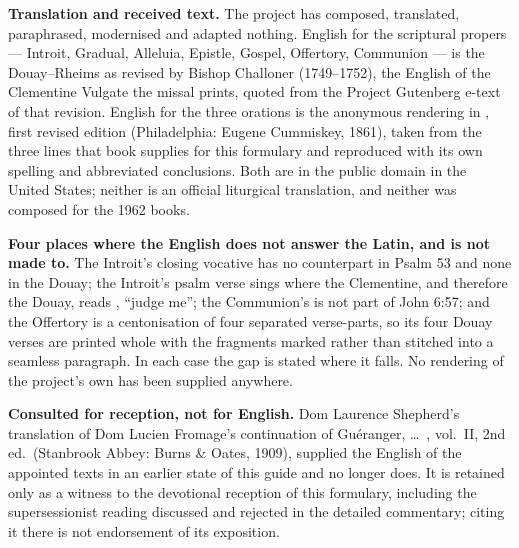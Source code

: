 \textbf{Translation and received text.} The project has composed, translated,
paraphrased, modernised and adapted nothing. English for the scriptural
propers --- Introit, Gradual, Alleluia, Epistle, Gospel, Offertory, Communion
--- is the Douay--Rheims as revised by Bishop Challoner (1749--1752), the
English of the Clementine Vulgate the missal prints, quoted from the Project
Gutenberg e-text of that revision. English for the three orations is the
anonymous rendering in , first revised edition (Philadelphia:
Eugene Cummiskey, 1861), taken from the three lines that book supplies for
this formulary and reproduced with its own spelling and abbreviated
conclusions. Both are in the public domain in the United States; neither is an
official liturgical translation, and neither was composed for the 1962 books.

\textbf{Four places where the English does not answer the Latin, and is not
made to.} The Introit's closing vocative  has no
counterpart in Psalm 53 and none in the Douay; the Introit's psalm verse sings
 where the Clementine, and therefore the Douay, reads
, ``judge me''; the Communion's  is not
part of John 6:57; and the Offertory is a centonisation of four separated
verse-parts, so its four Douay verses are printed whole with the fragments
marked rather than stitched into a seamless paragraph. In each case the gap is
stated where it falls. No rendering of the project's own has been supplied
anywhere.

\textbf{Consulted for reception, not for English.} Dom Laurence Shepherd's
translation of Dom Lucien Fromage's continuation of Guéranger,  \dots\ , vol.~II, 2nd ed.\ (Stanbrook Abbey: Burns \& Oates, 1909),
supplied the English of the appointed texts in an earlier state of this guide
and no longer does. It is retained only as a witness to the devotional
reception of this formulary, including the supersessionist reading discussed
and rejected in the detailed commentary; citing it there is not endorsement of
its exposition.

